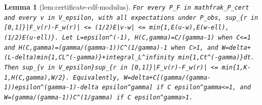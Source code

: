 \documentclass{article}
\newtheorem{lemma}{Lemma}
\begin{document}
\begin{lemma}[lem:certificate-cdf-modulus]\label{lem:certificate-cdf-modulus}
\texttt{For every P\_F in mathfrak\_P\_cert and every v in V\_epsilon, with all expectations under P\_obs, sup\_\{r in [0,1]\}|F\_v(r)-F\_w(r)| <= (1/2)E|v-w| <= min\{1,E(u-w),E(w-ell),(1/2)E(u-ell)\}. Let L=epsilon\textasciicircum{}(-1), H(C,gamma)=C/(gamma-1) when C<=1 and H(C,gamma)=(gamma/(gamma-1))C\textasciicircum{}(1/gamma)-1 when C>1, and W=delta+(L-delta)min\{1,CL\textasciicircum{}(-gamma)\}+integral\_L\textasciicircum{}infinity min\{1,Ct\textasciicircum{}(-gamma)\}dt. Then sup\_\{v in V\_epsilon\}sup\_\{r in [0,1]\}|F\_v(r)-F\_w(r)| <= min\{1,K-1,H(C,gamma),W/2\}. Equivalently, W=delta+C[(gamma/(gamma-1))epsilon\textasciicircum{}(gamma-1)-delta epsilon\textasciicircum{}gamma] if C epsilon\textasciicircum{}gamma<=1, and W=(gamma/(gamma-1))C\textasciicircum{}(1/gamma) if C epsilon\textasciicircum{}gamma>1.}
\end{lemma}
\end{document}
